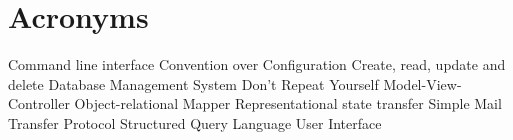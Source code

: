 \newpage
\section*{Acronyms}
\begin{acronym}
	  {Command line interface}
	  {Convention over Configuration}
	 {Create, read, update and delete}
	 {Database Management System}
	  {Don't Repeat Yourself}
	  {Model-View-Controller}
	  {Object-relational Mapper}
	 {Representational state transfer}
	 {Simple Mail Transfer Protocol}
	  {Structured Query Language}
		{User Interface}
\end{acronym}
